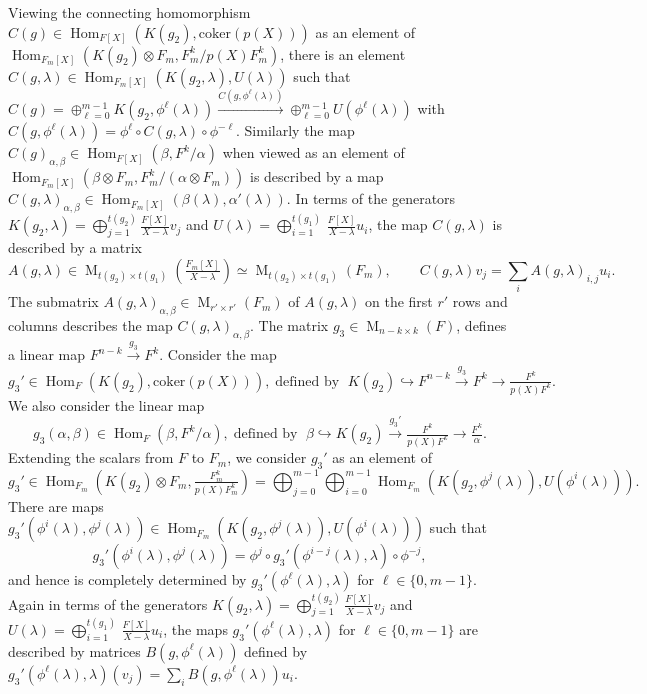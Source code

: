 \documentclass[reqno]{amsart}
\theoremstyle{definition}
\theoremstyle{remark}
\numberwithin{equation}{section}
\DeclareMathOperator{\Hom}{Hom}
\DeclareMathOperator{\M}{M}
\begin{document}
{Viewing the 
connecting homomorphism $C(g) \in \Hom_{F[X]}(K(g_2), \text{coker}(p(X)))$ as an element of $\Hom_{F_m[X]}(K(g_2)\otimes F_m, F_m^k/p(X) F_m^k)$, there is an element $C(g,\lambda) \in \Hom_{F_m[X]}(K(g_2, \lambda), U(\lambda))$ such that $C(g)=\oplus_{\ell=0}^{m-1} K(g_2, \phi^\ell(\lambda)) \xrightarrow{C(g,\phi^\ell(\lambda))} \oplus_{\ell=0}^{m-1} U(\phi^\ell(\lambda))$ with $C(g,\phi^\ell(\lambda)) = \phi^\ell \circ C(g,\lambda) \circ \phi^{-\ell}$. Similarly the map $C(g)_{\alpha, \beta} \in \Hom_{F[X]}(\beta, F^k/\alpha)$ when viewed as an element of $\Hom_{F_m[X]}(\beta \otimes F_m, F_m^k/(\alpha \otimes F_m))$ is described by a map $C(g,\lambda)_{\alpha, \beta} \in \Hom_{F_m[X]}(\beta(\lambda), \alpha'(\lambda))$. In terms of the generators $K(g_2,\lambda) = \bigoplus_{j=1}^{t(g_2)} \tfrac{F[X]}{X-\lambda} v_j$ and $U(\lambda)= \bigoplus_{i=1}^{t(g_1)} \, \tfrac{F[X]}{X-\lambda} u_i$, the map $C(g,\lambda)$ is described by a matrix \[ A(g, \lambda) \in \M_{t(g_2) \times t(g_1)}(\tfrac{F_m[X]}{X-\lambda}) \simeq \M_{t(g_2) \times t(g_1)}(F_m), \qquad C(g, \lambda) v_j = \sum_i A(g,\lambda)_{i,j} u_i.\] The submatrix $A(g,\lambda)_{\alpha, \beta} \in \M_{r' \times r'}(F_m)$ of 
$A(g, \lambda)$ on the first $r'$ rows and columns 
describes the map $C(g,\lambda)_{\alpha, \beta}$. The matrix $g_3 \in \M_{n-k \times k}(F)$, defines a linear map $F^{n-k} \xrightarrow{g_3} F^k$. Consider the map 
\[g_3' \in \Hom_F(K(g_2), \text{coker}(p(X))), \; \text{defined by }\;  K(g_2) \hookrightarrow F^{n-k} \xrightarrow{g_3} F^k \to \tfrac{F^k}{p(X) F^k}.\]
We also consider the linear map 
\[ g_3(\alpha, \beta) \in \Hom_{F}(\beta, F^k/\alpha), \; \text{defined  by } \; \beta \hookrightarrow K(g_2) \xrightarrow{g_3'} \tfrac{F^k}{p(X) F^k} \to \tfrac{F^k}{\alpha}.\]
Extending the scalars  from $F$ to $F_m$, we consider $g_3'$ as an element of  
\[ g_3' \in \Hom_{F_m}(K(g_2)\otimes F_m, \tfrac{F_m^k}{p(X) F_m^k}) = \bigoplus_{j=0}^{m-1} \bigoplus_{i=0}^{m-1}  \Hom_{F_m}(K(g_2, \phi^j(\lambda)), U(\phi^i(\lambda))).\]
There are maps $g_3'(\phi^i(\lambda), \phi^j(\lambda)) \in \Hom_{F_m}(K(g_2, \phi^j(\lambda)), U(\phi^i(\lambda)))$ such that
\[ g_3'(\phi^i(\lambda), \phi^j(\lambda)) =  \phi^j \circ g_3'(\phi^{i-j}(\lambda), \lambda) \circ \phi^{-j},\] and hence is completely determined by $g_3'(\phi^\ell(\lambda), \lambda)$ for $\ell \in \{0, m-1\}$.  Again in terms of  the generators $K(g_2,\lambda) = \bigoplus_{j=1}^{t(g_2)} \tfrac{F[X]}{X-\lambda} v_j$ and $U(\lambda)= \bigoplus_{i=1}^{t(g_1)} \, \tfrac{F[X]}{X-\lambda} u_i$, the maps $g_3'(\phi^\ell(\lambda), \lambda)$ for $\ell \in \{0, m-1\}$ are described by matrices $B(g, \phi^\ell(\lambda))$ defined by $g_3'(\phi^\ell(\lambda), \lambda)(v_j)=\sum_i B(g, \phi^\ell(\lambda)) u_i$. 
}
\end{document}
